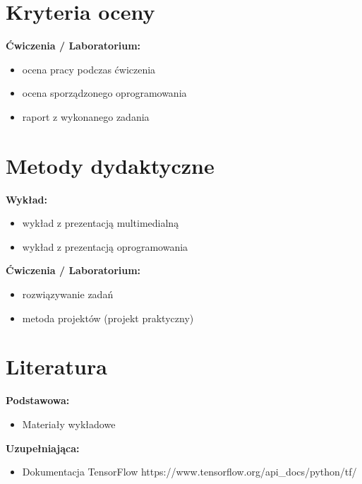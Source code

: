 \documentclass[12pt, a4paper]{article}
\begin{document}
\section{Kryteria oceny}

\textbf{Ćwiczenia / Laboratorium:}
\begin{itemize}
  \item ocena pracy podczas ćwiczenia
  \item ocena sporządzonego oprogramowania
  \item raport z wykonanego zadania
\end{itemize}


\section{Metody dydaktyczne}

\textbf{Wykład:}
\begin{itemize}
  \item wykład z prezentacją multimedialną
  \item wykład z prezentacją oprogramowania
\end{itemize}
\vspace{4pt}
\textbf{Ćwiczenia / Laboratorium:}
\begin{itemize}
  \item rozwiązywanie zadań
  \item metoda projektów (projekt praktyczny)
\end{itemize}
\vspace{4pt}


\section{Literatura}

\textbf{Podstawowa:}
\begin{itemize}
  \item Materiały wykładowe
\end{itemize}

\textbf{Uzupełniająca:}
\begin{itemize}
  \item Dokumentacja TensorFlow https://www.tensorflow.org/api\_docs/python/tf/
\end{itemize}
\end{document}
